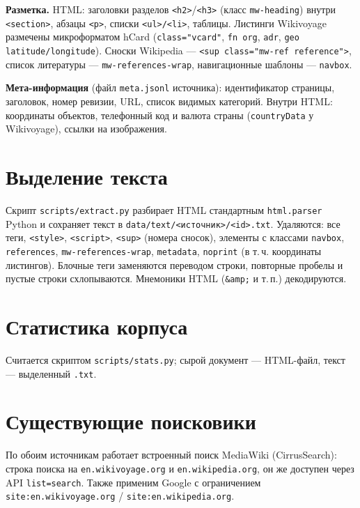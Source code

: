 \textbf{Разметка.} HTML: заголовки разделов \texttt{<h2>}/\texttt{<h3>} (класс \texttt{mw-heading}) внутри \texttt{<section>}, абзацы \texttt{<p>}, списки \texttt{<ul>/<li>}, таблицы. Листинги Wikivoyage размечены микроформатом hCard (\texttt{class="vcard"}, \texttt{fn org}, \texttt{adr}, \texttt{geo latitude/longitude}). Сноски Wikipedia --- \texttt{<sup class="mw-ref reference">}, список литературы --- \texttt{mw-references-wrap}, навигационные шаблоны --- \texttt{navbox}.

\textbf{Мета-информация} (файл \texttt{meta.jsonl} источника): идентификатор страницы, заголовок, номер ревизии, URL, список видимых категорий. Внутри HTML: координаты объектов, телефонный код и валюта страны (\texttt{countryData} у Wikivoyage), ссылки на изображения.

\section{Выделение текста}
Скрипт \texttt{scripts/extract.py} разбирает HTML стандартным \texttt{html.parser} Python и сохраняет текст в \texttt{data/text/<источник>/<id>.txt}. Удаляются: все теги, \texttt{<style>}, \texttt{<script>}, \texttt{<sup>} (номера сносок), элементы с классами \texttt{navbox}, \texttt{references}, \texttt{mw-references-wrap}, \texttt{metadata}, \texttt{noprint} (в т.\,ч. координаты листингов). Блочные теги заменяются переводом строки, повторные пробелы и пустые строки схлопываются. Мнемоники HTML (\texttt{\&amp;} и т.\,п.) декодируются.

\section{Статистика корпуса}
Считается скриптом \texttt{scripts/stats.py}; сырой документ --- HTML-файл, текст --- выделенный \texttt{.txt}.

\begin{center}
\resizebox{\textwidth}{!}{}
\end{center}

\section{Существующие поисковики}
По обоим источникам работает встроенный поиск MediaWiki (CirrusSearch): строка поиска на \texttt{en.wikivoyage.org} и \texttt{en.wikipedia.org}, он же доступен через API \texttt{list=search}. Также применим Google с ограничением \texttt{site:en.wikivoyage.org} / \texttt{site:en.wikipedia.org}.

